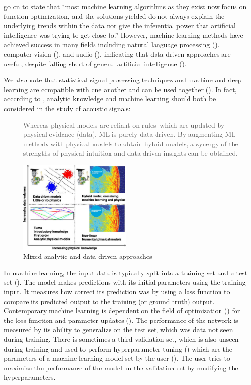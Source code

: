 \documentclass[report.tex]{subfiles}
\begin{document}
\textcite{introtodl} go on to state that ``most machine learning algorithms as they exist now focus on function optimization, and the solutions yielded do not always explain the underlying trends within the data nor give the inferential power that artificial intelligence was trying to get close to.'' However, machine learning methods have achieved success in many fields including natural language processing (\cite{nlpml}), computer vision (\cite{cvml}), and audio (\cite{audiodeeplearning}), indicating that data-driven approaches are useful, despite falling short of general artificial intelligence (\cite{generalai}).

We also note that statistical signal processing techniques and machine and deep learning are compatible with one another and can be used together (\cite{mlsp1, mlsp2}). In fact, according to \textcite{mldspmix}, analytic knowledge and machine learning should both be considered in the study of acoustic signals:

\begin{quote}
	Whereas physical models are reliant on rules, which are updated by physical evidence (data), ML is purely data-driven. By augmenting ML methods with physical models to obtain hybrid models, a synergy of the strengths of physical intuition and data-driven insights can be obtained.
\end{quote}

\begin{figure}[ht]
	\centering
	\includegraphics[width=0.5\textwidth]{./images-neural/dspmlmix.jpg}
	\caption{Mixed analytic and data-driven approaches}
	\label{fig:dspmlmix}
\end{figure}

In machine learning,  the input data is typically split into a training set and a test set (\cite{introtoml}). The model makes predictions with its initial parameters using the training input. It measures how correct its prediction was by using a loss function to compare its predicted output to the training (or ground truth) output. Contemporary machine learning is dependent on the field of optimization (\cite{boyd2004convex, mlopt1, mlopt2}) for the loss function and parameter updates (\cite{sgd}). The performance of the network is measured by its ability to generalize on the test set, which was data not seen during training. There is sometimes a third validation set, which is also unseen during training and used to perform hyperparameter tuning (\cite{splitvaliddata}) which are the parameters of a machine learning model set by the user (\cite{introtodl}). The user tries to maximize the performance of the model on the validation set by modifying the hyperparameters.
\end{document}
